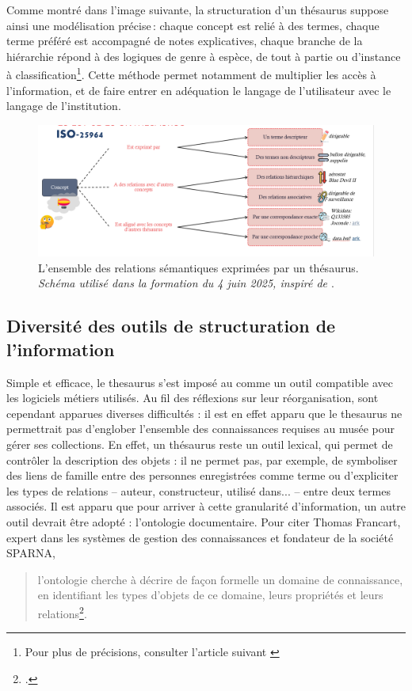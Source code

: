 Comme montré dans l'image suivante, la structuration d’un thésaurus suppose ainsi une modélisation précise : chaque concept est relié à des termes, chaque terme préféré est accompagné de notes explicatives, chaque branche de la hiérarchie répond à des logiques de genre à espèce, de tout à partie ou  d'instance à classification\footnote{Pour plus de précisions, consulter l'article suivant \cite{perrinBonnesPratiquesPour2020}}. Cette méthode permet notamment de multiplier les accès à l'information, et de faire entrer en adéquation le langage de l'utilisateur avec le langage de l'institution. 

\begin{figure}
	\centering
	\includegraphics[width=0.9\linewidth]{img/SCHEM_thesaurus}
	\caption[Relations sémantiques exprimées par un thésaurus]{L'ensemble des relations sémantiques exprimées par un thésaurus. \textit{Schéma utilisé dans la formation du 4 juin 2025, inspiré de \protect\cite{perrinBonnesPratiquesPour2020}}.}
	\label{fig:schemthesaurus}
\end{figure}


\subsection{Diversité des outils de structuration de l’information}

Simple et efficace, le \gls{thesaurus} s'est imposé au \mae comme un outil compatible avec les logiciels métiers utilisés. Au fil des réflexions sur leur réorganisation, sont cependant apparues diverses difficultés : il est en effet apparu que le \gls{thesaurus} ne permettrait pas d'englober l'ensemble des connaissances requises au musée pour gérer ses collections. En effet, un thésaurus reste un outil lexical, qui permet de contrôler la description des objets : il ne permet pas, par exemple, de symboliser des liens de famille entre des personnes enregistrées comme terme ou d'expliciter les types de relations -- auteur, constructeur, utilisé dans... -- entre deux termes associés.
Il est apparu que pour arriver à cette granularité d'information, un autre outil devrait être adopté : l'ontologie documentaire. Pour citer Thomas Francart, expert dans les systèmes de gestion des connaissances et fondateur de la société SPARNA, \blockquote{l’ontologie cherche à décrire de façon formelle un domaine de connaissance, en identifiant les types d’objets de ce domaine, leurs propriétés et leurs relations\footcite{francartOntologieThesaurusTaxonomie2013}.}

